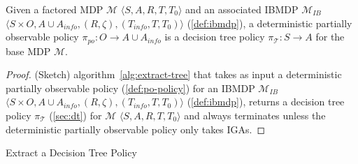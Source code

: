 \begin{proposition}\label{def:po-policy}
    Given a factored MDP $\mathcal{M}$ $\langle S, A, R, T, T_0\rangle$ and an associated IBMDP $\mathcal{M}_{IB}$ $\langle S \times O,A \cup A_{info}, (R, \zeta), (T_{info}, T, T_0)\rangle$ (\ref{def:ibmdp}), a deterministic partially observable policy $\pi_{po}: O \rightarrow A\cup A_{info}$ is a decision tree policy $\pi_{\mathcal{T}}: S \rightarrow A$ for the base MDP $\mathcal{M}$.
\end{proposition}

\begin{proof}(Sketch) algorithm~\ref{alg:extract-tree} that takes as input a deterministic partially observable policy (\ref{def:po-policy}) for an IBMDP $\mathcal{M}_{IB}$ $\langle S \times O,A \cup A_{info}, (R, \zeta), (T_{info}, T, T_0)\rangle$ (\ref{def:ibmdp}), returns a decision tree policy $\pi_{\mathcal{T}}$ (\ref{sec:dt}) for $\mathcal{M}$ $\langle S, A, R, T, T_0\rangle$ and always terminates unless the deterministic partially observable policy only takes IGAs.
\end{proof}

\begin{algorithm}[t]
    
    
    \caption{Extract a Decision Tree Policy}\label{alg:extract-tree}
\end{algorithm}

